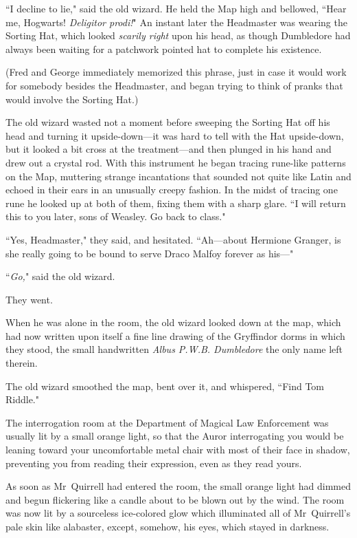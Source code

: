 ``I decline to lie," said the old wizard. He held the Map high and bellowed, ``Hear me, Hogwarts! \emph{Deligitor prodi!}" An instant later the Headmaster was wearing the Sorting Hat, which looked \emph{scarily right} upon his head, as though Dumbledore had always been waiting for a patchwork pointed hat to complete his existence.

(Fred and George immediately memorized this phrase, just in case it would work for somebody besides the Headmaster, and began trying to think of pranks that would involve the Sorting Hat.)

The old wizard wasted not a moment before sweeping the Sorting Hat off his head and turning it upside-down—it was hard to tell with the Hat upside-down, but it looked a bit cross at the treatment—and then plunged in his hand and drew out a crystal rod. With this instrument he began tracing rune-like patterns on the Map, muttering strange incantations that sounded not quite like Latin and echoed in their ears in an unusually creepy fashion. In the midst of tracing one rune he looked up at both of them, fixing them with a sharp glare. ``I will return this to you later, sons of Weasley. Go back to class."

``Yes, Headmaster," they said, and hesitated. ``Ah—about Hermione Granger, is she really going to be bound to serve Draco Malfoy forever as his—"

``\emph{Go,}" said the old wizard.

They went.

When he was alone in the room, the old wizard looked down at the map, which had now written upon itself a fine line drawing of the Gryffindor dorms in which they stood, the small handwritten \emph{Albus P.W.B. Dumbledore} the only name left therein.

The old wizard smoothed the map, bent over it, and whispered, ``Find Tom Riddle."

\later

The interrogation room at the Department of Magical Law Enforcement was usually lit by a small orange light, so that the Auror interrogating you would be leaning toward your uncomfortable metal chair with most of their face in shadow, preventing you from reading their expression, even as they read yours.

As soon as Mr~Quirrell had entered the room, the small orange light had dimmed and begun flickering like a candle about to be blown out by the wind. The room was now lit by a sourceless ice-colored glow which illuminated all of Mr~Quirrell's pale skin like alabaster, except, somehow, his eyes, which stayed in darkness.

